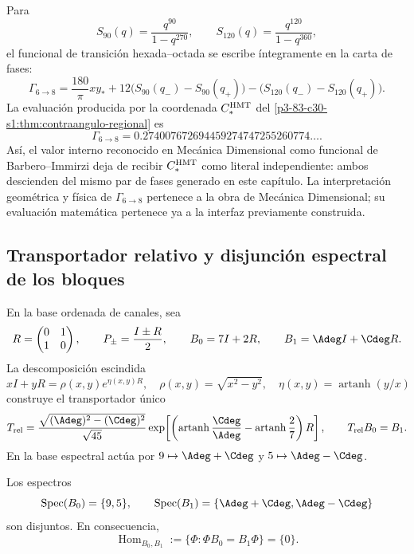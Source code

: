 Para
\[
S_{90}(q)=\frac{q^{90}}{1-q^{270}},
\qquad
S_{120}(q)=\frac{q^{120}}{1-q^{360}},
\]
el funcional de transición hexada--octada se escribe íntegramente en la
carta de fases:
\[
\Gamma_{6\to8}
=\frac{180}{\pi}xy_*
+12\bigl(S_{90}(q_-)-S_{90}(q_+)\bigr)
-\bigl(S_{120}(q_-)-S_{120}(q_+)\bigr).
\]
La evaluación producida por la coordenada \(C_*^{\rm HMT}\) del
\cref{p3-83-c30-s1:thm:contraangulo-regional} es
\[
\boxed{
\Gamma_{6\to8}
=0.274007672694459274747255260774\ldots.}
\]
Así, el valor interno reconocido en Mecánica Dimensional como funcional de
Barbero--Immirzi deja de recibir \(C_*^{\rm HMT}\) como literal independiente:
ambos descienden del mismo par de fases generado en este capítulo. La
interpretación geométrica y física de \(\Gamma_{6\to8}\) pertenece a la obra
de Mecánica Dimensional; su evaluación matemática pertenece ya a la interfaz
previamente construida.

\subsection{Transportador relativo y disjunción espectral de los bloques}
\label{sec:s102:c38:6:2}

\label{p3-83-c30-s1:sec:transportador-relativo-split}

En la base ordenada de canales, sea
\[
 R=\begin{pmatrix}0&1\\1&0\end{pmatrix},
 \qquad P_\pm=\frac{I\pm R}{2},
 \qquad
 B_0=7I+2R,
 \qquad B_1=\Adeg I+\Cdeg R.
\]
La descomposición escindida
\[
 xI+yR=\rho(x,y)e^{\eta(x,y)R},
 \quad \rho(x,y)=\sqrt{x^2-y^2},
 \quad \eta(x,y)=\operatorname{artanh}(y/x)
\]
construye el transportador único
\[
 T_{\rm rel}
 =\frac{\sqrt{(\Adeg)^2-(\Cdeg)^2}}{\sqrt{45}}
   \exp\!\left[
   \left(\operatorname{artanh}\frac{\Cdeg}{\Adeg}
   -\operatorname{artanh}\frac27\right)R\right],
 \qquad T_{\rm rel}B_0=B_1.
\]
En la base espectral actúa por
\(9\mapsto\Adeg+\Cdeg\) y
\(5\mapsto\Adeg-\Cdeg\).

\begin{theorem}
\label{p3-83-c30-s1:thm:no-go-entrelazador-bloques-split}
Los espectros
\[
 \operatorname{Spec}(B_0)=\{9,5\},\qquad
 \operatorname{Spec}(B_1)=\{\Adeg+\Cdeg,\Adeg-\Cdeg\}
\]
son disjuntos. En consecuencia,
\[
 \operatorname{Hom}_{B_0,B_1}
 :=\{\Phi:\Phi B_0=B_1\Phi\}=\{0\}.
\]
\end{theorem}

